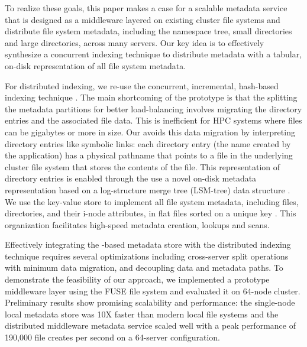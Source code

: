  
To realize these goals, this paper makes a case for a scalable metadata service 
that is designed as a middleware layered on existing cluster file systems and 
distribute file system metadata, including the namespace tree, small 
directories and large directories, across many servers.
Our key idea is to effectively synthesize a concurrent indexing 
technique to distribute metadata with a tabular, on-disk representation of all
file system metadata. 

For distributed indexing, we re-use the concurrent, incremental, hash-based
\giga{} indexing technique \citep{giga}.
The main shortcoming of the \giga{} prototype is that the splitting
the metadata partitions for better load-balancing involves migrating the
directory entries and the associated file data\citep{giga}.
This is inefficient for HPC systems where files can be gigabytes or more in
size. Our \giga{} avoids this data migration by interpreting directory entries
like symbolic links: each directory entry (the name created by the
application) has a physical pathname that points to a file in the underlying
cluster file system that stores the contents of the file.
This representation of directory entries is enabled through the use a novel
on-disk metadata representation based on a log-structure merge tree (LSM-tree)
data structure \citep{ONeil1996}.
We use the \ldb{} key-value store to implement all file system metadata, including 
files, directories, and their i-node attributes, in flat files sorted on a
unique key \citep{LevelDB}.
This organization facilitates high-speed metadata creation, lookups and scans.

Effectively integrating the \ldb-based metadata store with the distributed indexing
technique requires several optimizations including cross-server split operations 
with minimum data migration, and decoupling data and metadata paths.
To demonstrate the feasibility of our approach, we implemented a prototype middleware layer
using the FUSE file system and evaluated it on 64-node cluster. Preliminary
results show promising scalability and performance: the single-node local metadata 
store was 10X faster than modern local file systems and the distributed
middleware metadata service scaled well with a peak performance of 190,000 file creates per second 
on a 64-server configuration. 


